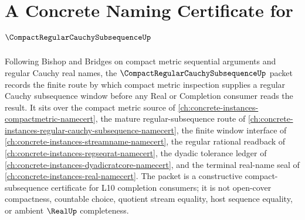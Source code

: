 \chapter{A Concrete Naming Certificate for $\CompactRegularCauchySubsequenceUp$}
\label{ch:concrete-instances-compact-regular-cauchy-subsequence-namecert}

Following Bishop and Bridges on compact metric sequential arguments and regular Cauchy real names, the $\CompactRegularCauchySubsequenceUp$ packet records the finite route by which compact metric inspection supplies a regular Cauchy subsequence window before any Real or Completion consumer reads the result. It sits over the compact metric source of \autoref{ch:concrete-instances-compactmetric-namecert}, the mature regular-subsequence route of \autoref{ch:concrete-instances-regular-cauchy-subsequence-namecert}, the finite window interface of \autoref{ch:concrete-instances-streamname-namecert}, the regular rational readback of \autoref{ch:concrete-instances-regseqrat-namecert}, the dyadic tolerance ledger of \autoref{ch:concrete-instances-dyadicratcore-namecert}, and the terminal real-name seal of \autoref{ch:concrete-instances-real-namecert}. The packet is a constructive compact-subsequence certificate for L10 completion consumers; it is not open-cover compactness, countable choice, quotient stream equality, host sequence equality, or ambient $\RealUp$ completeness.

